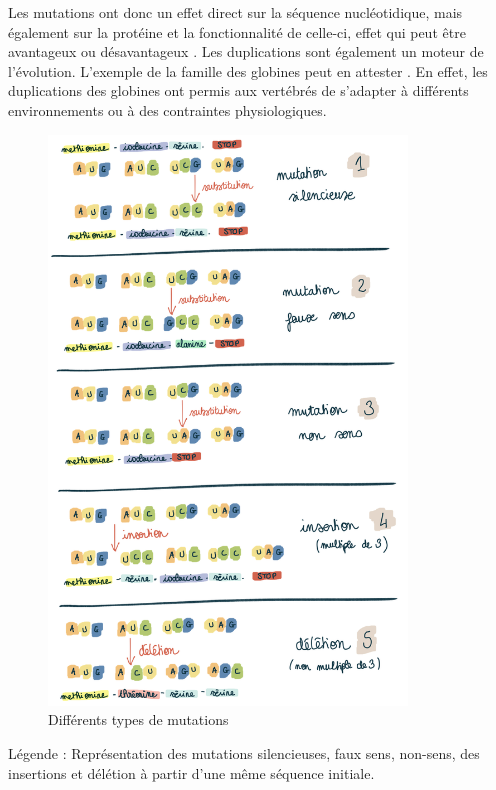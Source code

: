 \par Les mutations ont donc un effet direct sur la séquence nucléotidique, mais également sur la protéine et la fonctionnalité de celle-ci, effet qui peut être avantageux ou désavantageux \parencite{long_origin_2003}. Les duplications sont également un moteur de l’évolution. L’exemple de la famille des globines peut en attester \parencite{weatherall_molecular_1976}. En effet, les duplications des globines ont permis aux vertébrés de s’adapter à différents environnements ou à des contraintes physiologiques. 

\begin{figure}[H]
    \centering
    \includegraphics[width=0.85\textwidth]{figures/corps/figure2.png}
    \caption{Différents types de mutations}
    \label{fig:2_mutations}
\end{figure}
Légende : Représentation des mutations silencieuses, faux sens, non-sens, des insertions et délétion à partir d’une même séquence initiale. \\

